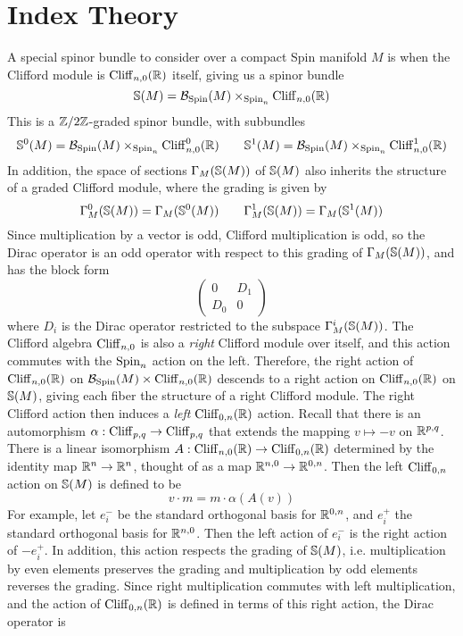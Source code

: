 %
\section{Index Theory}
%
A special spinor bundle to consider over a compact Spin manifold $M$ is when the Clifford
module is $\Cliff_{n,0}(\R)$ itself, giving us a spinor bundle
\[
\S(M) = \B_{\Spin}(M) \times_{\Spin_n} \Cliff_{n,0}(\R)
\]
This is a $\Z/2\Z$-graded spinor bundle, with subbundles
\[
\S^0(M) = \B_{\Spin}(M) \times_{\Spin_n} \Cliff_{n,0}^0(\R) \qquad
\S^1(M) = \B_{\Spin}(M) \times_{\Spin_n} \Cliff_{n,0}^1(\R)
\]
In addition, the space of sections $\Gamma_M(\S(M))$ of $\S(M)$ also inherits the
structure of a graded Clifford module, where the grading is given by
\[
\Gamma_M^0(\S(M)) = \Gamma_M(\S^0(M)) \qquad \Gamma_M^1(\S(M)) = \Gamma_M(\S^1(M))
\]
Since multiplication by a vector is odd, Clifford multiplication is odd, so
the Dirac operator is an odd operator with respect to this grading of $\Gamma_M(\S(M))$,
and has the block form
\[
\begin{pmatrix}
0 & D_1 \\
D_0 & 0
\end{pmatrix}
\]
where $D_i$ is the Dirac operator restricted to the subspace $\Gamma_M^i(\S(M))$.
The Clifford algebra $\Cliff_{n,0}$ is also a \emph{right} Clifford module over
itself, and this action commutes with the $\Spin_n$ action on the left. Therefore,
the right action of $\Cliff_{n,0}(\R)$ on $\B_{\Spin}(M) \times \Cliff_{n,0}(\R)$
descends to a right action on $\Cliff_{n,0}(\R)$ on $\S(M)$, giving each fiber
the structure of a right Clifford module. The right Clifford action then induces
a \emph{left} $\Cliff_{0,n}(\R)$ action. Recall that there is an automorphism
$\alpha : \Cliff_{p,q} \to \Cliff_{p,q}$ that extends the mapping $v \mapsto -v$
on $\R^{p,q}$. There is a linear isomorphism $A : \Cliff_{n,0}(\R) \to \Cliff_{0,n}(\R)$
determined by the identity map $\R^n \to \R^n$, thought of as a map
$\R^{n,0} \to \R^{0,n}$. Then the left $\Cliff_{0,n}$ action on $\S(M)$ is defined
to be
\[
v \cdot m = m \cdot \alpha(A(v))
\]
For example, let $e_i^-$ be the standard orthogonal basis for $\R^{0,n}$, and
$e_i^+$ the standard orthogonal basis for $\R^{n,0}$. Then the left action of
$e_i^-$ is the right action of $-e_i^+$. In addition, this action respects
the grading of $\S(M)$, i.e. multiplication by even elements preserves the grading
and multiplication by odd elements reverses the grading. Since right
multiplication commutes with left multiplication, and the action of
$\Cliff_{0,n}(\R)$ is defined in terms of this right action, the Dirac operator is
